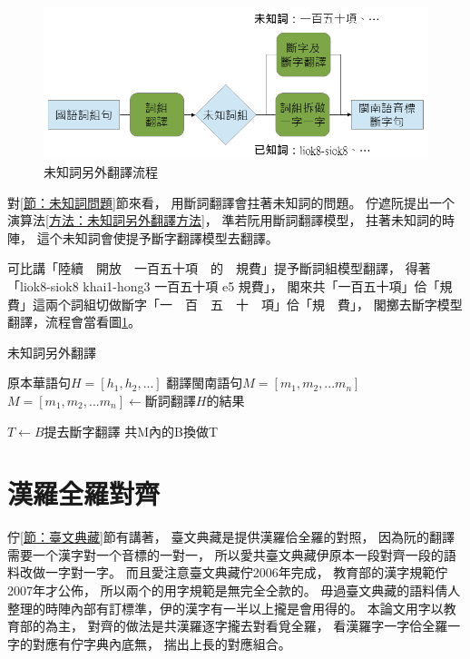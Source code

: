 \begin{figure}
\centerline{\includegraphics[keepaspectratio,width=40em]{圖/未知詞另外翻譯}}
\caption{未知詞另外翻譯流程}
\label{未知詞另外翻譯}
\end{figure}

對\ref{節：未知詞問題}節來看，
用斷詞翻譯會拄著未知詞的問題。
佇遮阮提出一个演算法\ref{方法：未知詞另外翻譯方法}，
準若阮用斷詞翻譯模型，
拄著未知詞的時陣，
這个未知詞會使提予斷字翻譯模型去翻譯。

可比講「陸續　開放　一百五十項　的　規費」提予斷詞組模型翻譯，
得著「liok8-siok8 khai1-hong3 一百五十項 e5 規費」，
閣來共「一百五十項」佮「規費」這兩个詞組切做斷字「一　百　五　十　項」佮「規　費」，
閣擲去斷字模型翻譯，流程會當看圖\ref{未知詞另外翻譯}。

\begin{algorithm}
  \caption{未知詞另外翻譯}
  \label{方法：未知詞另外翻譯方法}
  \begin{algorithmic}
    \REQUIRE \( 原本華語句H = [h_{1}, h_{2},...] \)
    \ENSURE \( 翻譯閩南語句M = [m_{1}, m_{2},...m_{n}] \)
    \STATE \( M = [m_{1}, m_{2},...m_{n}] \gets 斷詞翻譯H的結果 \)
    
		\STATE \( T \gets B提去斷字翻譯 \)
		\STATE 共M內的B換做T
	\ENDWHILE
  \end{algorithmic}
\end{algorithm}


\section{漢羅全羅對齊}
\label{節：漢羅全羅對齊}
佇\ref{節：臺文典藏}節有講著，
臺文典藏是提供漢羅佮全羅的對照，
因為阮的翻譯需要一个漢字對一个音標的一對一，
所以愛共臺文典藏伊原本一段對齊一段的語料改做一字對一字。
而且愛注意臺文典藏佇2006年完成，
教育部的漢字規範佇2007年才公佈，
所以兩个的用字規範是無完全仝款的。
毋過臺文典藏的語料倩人整理的時陣內部有訂標準，伊的漢字有一半以上攏是會用得的。
本論文用字以教育部的為主，
對齊的做法是共漢羅逐字攏去對看覓全羅，
看漢羅字一字佮全羅一字的對應有佇字典內底無，
揣出上長的對應組合。

